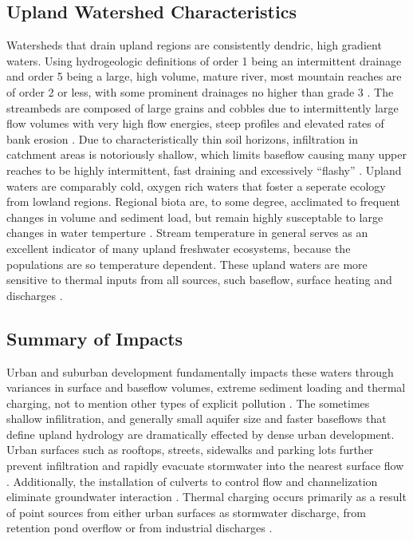\subsection{Upland Watershed Characteristics}
Watersheds that drain upland regions are consistently dendric, high gradient waters. Using hydrogeologic definitions of order 1 being an intermittent drainage and order 5 being a large, high volume, mature river, most mountain reaches are of order 2 or less, with some prominent drainages no higher than grade 3 \citep{watersheds}. The streambeds are composed of large grains and cobbles due to intermittently large flow volumes with very high flow energies, steep profiles and elevated rates of bank erosion \citep{thaxAdd}. Due to characteristically thin soil horizons, infiltration in catchment areas is notoriously shallow, which limits baseflow causing many upper reaches to be highly intermittent, fast draining and excessively “flashy” \citep{krautBASE}. Upland waters are comparably cold, oxygen rich waters that foster a seperate ecology from lowland regions. Regional biota are, to  some degree, acclimated to frequent changes in volume and sediment load, but remain highly susceptable to large changes in water temperture \citep{urban}. Stream temperature in general serves as an excellent indicator of many upland freshwater ecosystems, because the populations are so temperature dependent. These upland waters are more sensitive to thermal inputs from all sources, such baseflow, surface heating and discharges \citep{anderson}. 

\subsection{Summary of Impacts}
Urban and suburban development fundamentally impacts these waters through variances in surface and baseflow volumes, extreme sediment loading and thermal charging, not to mention other types of explicit pollution \citep{rgis}. The sometimes shallow infilitration, and generally small aquifer size and faster baseflows that define upland hydrology are dramatically effected by dense urban development. Urban surfaces such as rooftops, streets, sidewalks and parking lots further prevent infiltration and rapidly evacuate stormwater into the nearest surface flow \citep{rgis, krautBASE}. Additionally, the installation of culverts to control flow and channelization eliminate groundwater interaction \citep{anderson}. Thermal charging occurs primarily as a result of point sources from either urban surfaces as stormwater discharge, from retention pond overflow or from industrial discharges \citep{krautBASE}.

